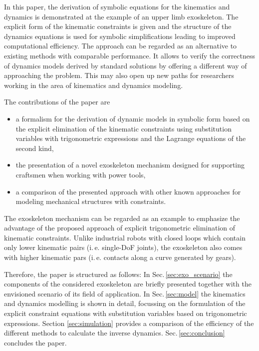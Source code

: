 \documentclass{svproc}
\begin{document}
In this paper, the derivation of symbolic equations for the kinematics and dynamics is demonstrated at the example of an upper limb exoskeleton.
The explicit form of the kinematic constraints is given and the structure of the dynamics equations is used for symbolic simplifications leading to improved computational efficiency.
The approach can be regarded as an alternative to existing methods with comparable performance.
It allows to verify the correctness of dynamics models derived by standard solutions by offering a different way of approaching the problem.
This may also open up new paths for researchers working in the area of kinematics and dynamics modeling.

The contributions of the paper are

\vspace{-0.20cm}

\begin{itemize}
    \item a formalism for the derivation of dynamic models in symbolic form based on the explicit elimination of the kinematic constraints using substitution variables with trigonometric expressions and the Lagrange equations of the second kind,
    \item the presentation of a novel exoskeleton mechanism designed for supporting craftsmen when working with power tools,
    \item a comparison of the presented approach with other known approaches for modeling mechanical structures with constraints.
\end{itemize}
\vspace{-0.25cm}
The exoskeleton mechanism can be regarded as an example to emphasize the advantage of the proposed approach of explicit trigonometric elimination of kinematic constraints.
Unlike industrial robots with closed loops which contain only lower kinematic pairs (i.\,e. single-DoF joints), the exoskeleton also comes with higher kinematic pars (i.\,e. contacts along a curve generated by gears).

Therefore, the paper is structured as follows:
In Sec.\,\ref{sec:exo_scenario} the components of the considered exoskeleton are briefly presented together with the envisioned scenario of its field of application. In Sec.\,\ref{sec:model} the kinematics and dynamics modelling is shown in detail, focussing on the formulation of the explicit constraint equations with substitution variables based on trigonometric expressions.
Section \ref{sec:simulation} provides a comparison of the efficiency of the different methods to calculate the inverse dynamics. Sec.\,\ref{sec:conclusion} concludes the paper.
\end{document}
